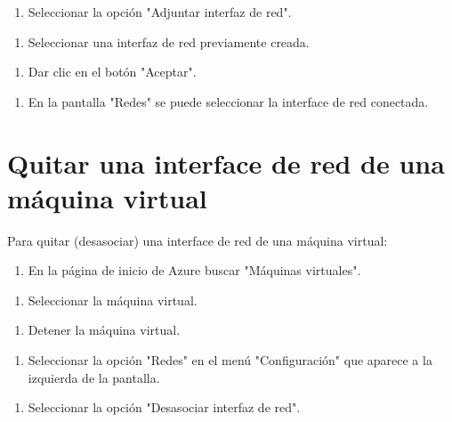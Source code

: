 \begin{enumerate}
\item Seleccionar la opción "Adjuntar interfaz de red".
\end{enumerate}

\begin{enumerate}
\item Seleccionar una interfaz de red previamente creada.
\end{enumerate}

\begin{enumerate}
\item Dar clic en el botón "Aceptar".
\end{enumerate}

\begin{enumerate}
\item En la pantalla "Redes" se puede seleccionar la interface de red conectada.
\end{enumerate}

\section{Quitar una interface de red de una máquina virtual}

Para quitar (desasociar) una interface de red de una máquina virtual:

\begin{enumerate}
\item En la página de inicio de Azure buscar "Máquinas virtuales".
\end{enumerate}

\begin{enumerate}
\item Seleccionar la máquina virtual.
\end{enumerate}

\begin{enumerate}
\item Detener la máquina virtual.
\end{enumerate}

\begin{enumerate}
\item Seleccionar la opción "Redes" en el menú "Configuración" que aparece a la izquierda de la pantalla.
\end{enumerate}

\begin{enumerate}
\item Seleccionar la opción "Desasociar interfaz de red".
\end{enumerate}

